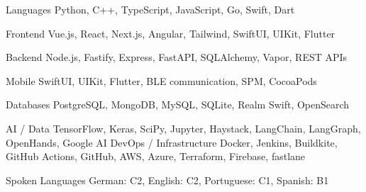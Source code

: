 

\begin{cvskills}

\cvskill
{Languages} %
{Python, C++, TypeScript, JavaScript, Go, Swift, Dart} %

\cvskill
{Frontend} %
{Vue.js, React, Next.js, Angular, Tailwind, SwiftUI, UIKit, Flutter} %

\cvskill
{Backend} %
{Node.js, Fastify, Express, FastAPI, SQLAlchemy, Vapor, REST APIs} %

\cvskill
{Mobile} %
{SwiftUI, UIKit, Flutter, BLE communication, SPM, CocoaPods} %

\cvskill
{Databases} %
{PostgreSQL, MongoDB, MySQL, SQLite, Realm Swift, OpenSearch} %

\cvskill
{AI / Data} %
{TensorFlow, Keras, SciPy, Jupyter, Haystack, LangChain, LangGraph, OpenHands, Google AI} %
\cvskill
{DevOps / Infrastructure} %
{Docker, Jenkins, Buildkite, GitHub Actions, GitHub, AWS, Azure, Terraform, Firebase, fastlane} %


\cvskill
{Spoken Languages} %
{German: C2, English: C2, Portuguese: C1, Spanish: B1} %


\end{cvskills}
